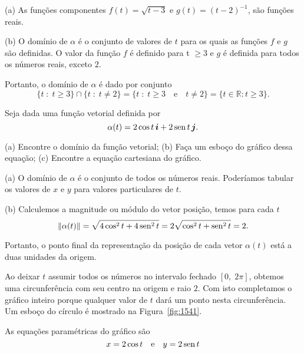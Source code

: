 \solo
(a) As funções componentes \(f(t) = \sqrt{t-3}\) e \(g(t) = (t-2)^{-1}\), são funções reais.

(b) O domínio de \(\alpha\) é o conjunto de valores de \(t\) para os quais as funções \(f\)  e \(g\)
são definidas. O valor da função \(f\) é definido para t \(\geq 3\) e \(g \) é definida para todos os números reais, exceto \(2\).

Portanto, o domínio de \(\alpha\) é dado por conjunto
\begin{equation*}
\{t \; \colon \;  t \geq 3\} \cap \{t \; \colon\;  t \neq 2\}=\{t\; \colon \;  t \geq 3\quad \text{e} \quad  t \neq 2\} = \{t \in \mathbb{R}\colon t \geq 3\}.
\end{equation*}

\begin{exc}\label{exer:5-02}
Seja dada uma função vetorial definida por
\begin{equation*}
  \alpha(t)=2\cos t\,\boldsymbol{i}+ 2\operatorname{sen} t\, \boldsymbol{j}.
\end{equation*}

\rm{(a)} Encontre o domínio da função vetorial;  \rm{(b)} Faça um esboço do gráfico dessa equação;  \rm{(c)} Encontre a equação cartesiana do gráfico.
\end{exc}

\solo
(a) O domínio de \(\alpha\) é o conjunto de todos os números reais. Poderíamos tabular os valores de \(x\) e \(y\) para valores particulares de \(t\).

(b) Calculemos a magnitude ou módulo  do vetor posição, temos para cada \(t\)
\begin{equation*}
\|\alpha(t)\| = \sqrt{4 \cos^{2} t + 4 \operatorname{sen}^{2} t} = 2 \sqrt{\cos^{2} t + \operatorname{sen}^{2} t} = 2.
\end{equation*}

Portanto, o ponto final da representação da posição de cada vetor \(\alpha(t)\) está a duas unidades da origem.

Ao deixar \(t\) assumir todos os números no intervalo fechado \([0,\; 2\pi]\), obtemos uma circunferência com seu centro na origem e raio \(2\). Com isto completamos o gráfico inteiro porque qualquer valor de \(t\) dará um ponto nesta circunferência. Um esboço do círculo é mostrado na Figura~\ref{fig:1541}.

As equações paramétricas do gráfico são
\begin{equation*}
x = 2 \cos t \quad \text{e}\quad  y = 2\operatorname{sen} t
\end{equation*}

